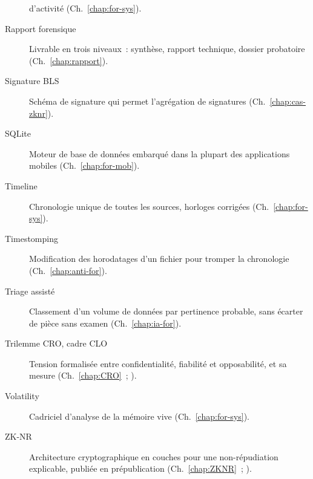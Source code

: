 \begin{description}
          d'activité (Ch.~\ref{chap:for-sys}).
    \item[Rapport forensique] Livrable en trois niveaux~: synthèse,
          rapport technique, dossier probatoire (Ch.~\ref{chap:rapport}).
    \item[Signature BLS] Schéma de signature qui permet l'agrégation de
          signatures (Ch.~\ref{chap:cas-zknr}).
    \item[SQLite] Moteur de base de données embarqué dans la plupart des
          applications mobiles (Ch.~\ref{chap:for-mob}).
    \item[Timeline] Chronologie unique de toutes les sources, horloges
          corrigées (Ch.~\ref{chap:for-sys}).
    \item[Timestomping] Modification des horodatages d'un fichier pour
          tromper la chronologie (Ch.~\ref{chap:anti-for}).
    \item[Triage assisté] Classement d'un volume de données par pertinence
          probable, sans écarter de pièce sans examen (Ch.~\ref{chap:ia-for}).
    \item[Trilemme CRO, cadre CLO] Tension formalisée entre confidentialité,
          fiabilité et opposabilité, et sa mesure (Ch.~\ref{chap:CRO}~;
          \cite{minka2025cro}).
    \item[Volatility] Cadriciel d'analyse de la mémoire vive
          (Ch.~\ref{chap:for-sys}).
    \item[ZK-NR] Architecture cryptographique en couches pour une
          non-répudiation explicable, publiée en prépublication
          (Ch.~\ref{chap:ZKNR}~; \cite{minka2025zknr}).
\end{description}
